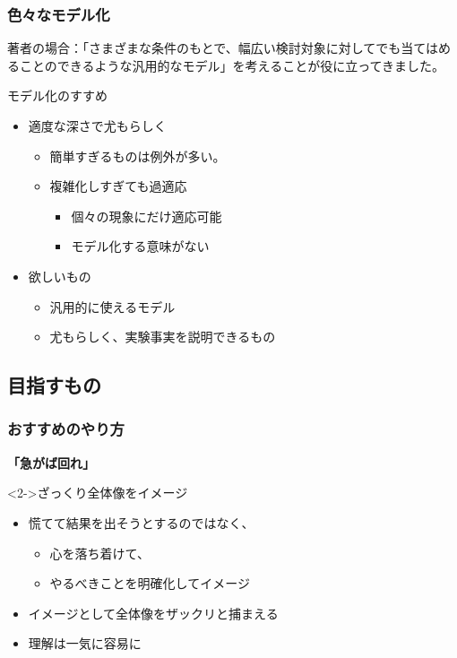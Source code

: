 \documentclass[unicode,12pt]{beamer}%
\begin{document}
\begin{frame}
	\frametitle{色々なモデル化}
	著者の場合：「さまざまな条件のもとで、幅広い検討対象に対してでも当てはめることのできるような汎用的なモデル」を考えることが役に立ってきました。
	\begin{exampleblock}{モデル化のすすめ}
		\begin{itemize}
			\item 適度な深さで尤もらしく
				\begin{itemize}
					\item 簡単すぎるものは例外が多い。
					\item 複雑化しすぎても過適応
						\begin{itemize}
							\item 個々の現象にだけ適応可能
							\item モデル化する意味がない
						\end{itemize}
				\end{itemize}
			\item 欲しいもの
				\begin{itemize}
					\item 汎用的に使えるモデル
					\item 尤もらしく、実験事実を説明できるもの
				\end{itemize}
		\end{itemize}
	\end{exampleblock}
\end{frame}

\subsection{目指すもの}

\begin{frame}
	\frametitle{おすすめのやり方}
	
	\begin{center}
		{\Huge \textbf{「急がば回れ」}}
	\end{center}
	
	\vspace{5mm}
	\begin{alertblock}<2->{ざっくり全体像をイメージ}
		\begin{itemize}
			\item 慌てて結果を出そうとするのではなく、
			\begin{itemize}
				\item 心を落ち着けて、
				\item やるべきことを明確化してイメージ
			\end{itemize}
			\item イメージとして全体像をザックリと捕まえる
			\item 理解は一気に容易に
		\end{itemize}
	\end{alertblock}
\end{frame}
\end{document}
